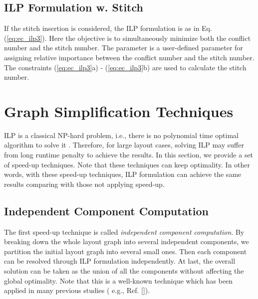 \documentclass[12pt]{spieman}
\theoremstyle{plain}
\begin{document}
\begin{spacing}{1}
\begin{figure}[h]
\end{figure}
\fi

\subsection{ILP Formulation w. Stitch}
If the stitch insertion is considered, the ILP formulation is as in Eq. (\ref{eq:ec_ilp3}).
Here the objective is to simultaneously minimize both the conflict number and the stitch number.
The parameter  is a user-defined parameter for assigning relative importance between the conflict number and the stitch number.
The constraints (\ref{eq:ec_ilp3}a) - (\ref{eq:ec_ilp3}b) are used to calculate the stitch number.

\begin{figure}[htb]
\centering

\end{figure}



\section{Graph Simplification Techniques}
\label{sec:tplec_speedup}


ILP is a classical NP-hard problem, i.e., there is no polynomial time optimal algorithm to solve it \cite{book90Algorithm}.
Therefore, for large layout cases, solving ILP may suffer from long runtime penalty to achieve the results.
In this section, we provide a set of speed-up techniques.
Note that these techniques can keep optimality.
In other words, with these speed-up techniques, ILP formulation can achieve the same results comparing with those not applying speed-up.

\subsection{Independent Component Computation}

The first speed-up technique is called \textit{independent component computation}.
By breaking down the whole layout graph into several independent components, we partition the initial layout graph into several small ones.
Then each component can be resolved through ILP formulation independently.
At last, the overall solution can be taken as the union of all the components without affecting the global optimality.
Note that this is a well-known technique which has been applied in many previous studies ( e.g., Ref. []).


\end{spacing}
\end{document}
